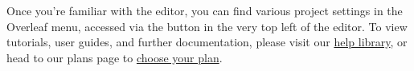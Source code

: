 \documentclass {article}
\begin{document}
Once you're familiar with the editor, you can find various project settings in the Overleaf menu, accessed via the button in the very top left of the editor. To view tutorials, user guides, and further documentation, please visit our \href{https://www.overleaf.com/learn}{help library}, or head to our plans page to \href{https://www.overleaf.com/user/subscription/plans}{choose your plan}.
\end{document}
